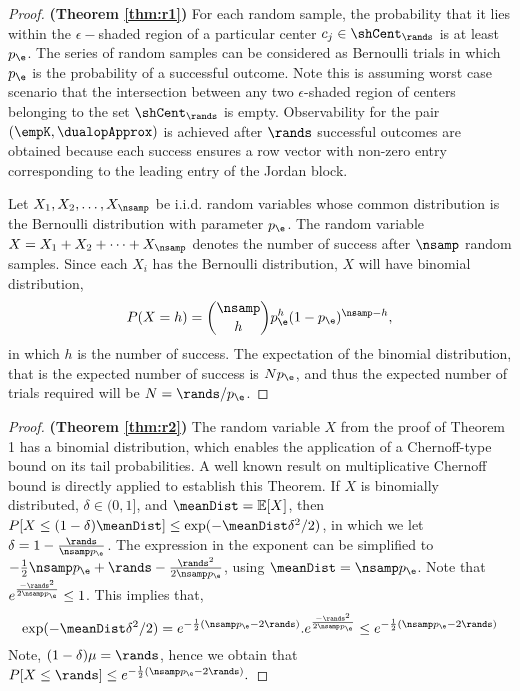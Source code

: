 \begin{proof}
	\textbf{(Theorem \ref{thm:r1})}
	For each random sample, the probability that it lies within the $ \epsilon- $shaded region of a particular center $ c_j \in \shCent_\rands$
	is at least $ p_{\e} $. The series of random samples can be considered as Bernoulli trials in which $p_{\e}$ is the probability of a successful outcome. Note this is assuming worst case scenario that the intersection between any two $ \epsilon $-shaded region of centers belonging to the set  $ \shCent_\rands $ is empty. Observability for the pair $ (\empK, \dualopApprox) $ is achieved after $ \rands  $ successful outcomes are obtained because each success ensures a row vector with non-zero entry corresponding to the leading entry of the Jordan block. 
	
	Let $ X_1, X_2, \dots, X_\nsamp $ be i.i.d. random variables whose common distribution is the Bernoulli distribution with parameter $p_{\e}$. The random variable $ X = X_1 + X_2+ \dots+ X_\nsamp $ denotes the number of success after $ \nsamp $ random samples. Since each $ X_i $ has the Bernoulli distribution, $ X $ will have binomial distribution, 
	\begin{equation*}
	P(X=h) = {\nsamp \choose h}p_{\e}^h (1-p_{\e})^{\nsamp-h},
	\end{equation*}
	in which $ h  $ is the number of success. The expectation of the binomial distribution, that is the expected number of success is $ Np_{\e} $, and thus the expected number of trials required will be $ N = \rands/p_{\e}$.
\end{proof}

\begin{proof}
	\textbf{(Theorem \ref{thm:r2})}
	The random variable $ X $ from the proof of Theorem 1 has a binomial distribution, which enables the application of a Chernoff-type bound on its tail probabilities. A well known result  on multiplicative Chernoff bound \cite{motwani2010randomized} is directly applied to establish this Theorem. If $ X $ is binomially distributed, $ \delta \in (0,1] $, and $ \meanDist = \mathbb{E}[X] $, then $ P[X\leq(1-\delta)\meanDist] \leq \exp(-\meanDist \delta^2/2) $, in which we let $ \delta = 1-\frac{\rands}{\nsamp p_{\e}}$.  The expression in the exponent can be simplified to $ -\frac{1}{2}\nsamp p_{\e}+\rands - \frac{\rands^2}{2\nsamp p_{\e}} $, using $ \meanDist = \nsamp p_{\e} $. Note that $ e^{\frac{-\rands^2}{2\nsamp p_{\e}}} \leq 1$. This implies that,
	\begin{equation*}
	\exp(-\meanDist \delta^2/2) =  e^{-\frac{1}{2}(\nsamp p_{\e}-2\rands)}.e^{\frac{-\rands^2}{2\nsamp p_{\e}}}\leq e^{-\frac{1}{2}(\nsamp p_{\e}-2\rands)}
	\end{equation*}
	Note, $ (1-\delta)\mu = \rands $, hence we obtain that $ P[X\leq\rands] \leq e^{-\frac{1}{2}(\nsamp p_{\e}-2\rands)}. $
\end{proof}


